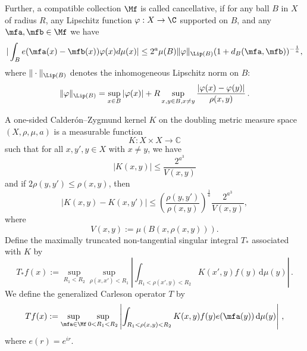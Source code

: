 Further, a compatible collection $\Mf$ is called cancellative, if
for any ball $B$ in $X$ of radius $R$, any Lipschitz function $\varphi: X\to \C$
supported on $B$, and any $\mfa,\mfb\in \Mf$ we have
\begin{equation}
    \label{eq-vdc-cond}
    |\int_B e(\mfa(x)-{\mfb(x)}) \varphi(x) d\mu(x)|\le 2^a \mu(B)\|\varphi\|_{\Lip(B)}
(1+d_B(\mfa,\mfb))^{-\frac{1}{a}},
\end{equation}
where $\|\cdot\|_{\Lip(B)}$ denotes the inhomogeneous Lipschitz norm on $B$:
$$
    \|\varphi\|_{\Lip(B)} = \sup_{x \in B} |\varphi(x)| + R \sup_{x,y \in B, x \neq y} \frac{|\varphi(x) - \varphi(y)|}{\rho(x,y)}\,.
$$

A one-sided Calder\'on--Zygmund kernel $K$ on the doubling metric measure space $(X, \rho, \mu, a)$ is a measurable function
 \begin{equation}\label{eqkernel0}
K:X\times X\to \mathbb{C}
 \end{equation}
such that for all $x,y',y\in X$ with $x\neq y$, we have
\begin{equation}\label{eqkernel-size}
    |K(x,y)| \leq \frac{2^{a^3}}{V(x,y)}
  \end{equation}
 and if $2\rho(y,y') \leq \rho(x,y)$, then
  \begin{equation}
  \label{eqkernel-y-smooth}
       |K(x,y) - K(x,y')| \leq \left(\frac{\rho(y,y')}{\rho(x,y)}\right)^{\frac{1}{a}}\frac{2^{a^3}}{V(x,y)},
\end{equation}
where \[V(x,y):=\mu(B(x,\rho(x,y))).\]
Define the maximally truncated non-tangential singular integral $T_{*}$ associated with $K$ by
\begin{equation}
    \label{def-tang-unm-op}
    T_{*}f(x):=\sup_{R_1 < R_2} \sup_{\rho(x,x')<R_1} \left|\int_{R_1< \rho(x',y) < R_2} K(x',y) f(y) \, \mathrm{d}\mu(y) \right|\,.
\end{equation}
We define the generalized Carleson operator $T$ by
 \begin{equation}
        \label{def-main-op}
        Tf(x):=\sup_{\mfa\in\Mf} \sup_{0 < R_1 < R_2}\left| \int_{R_1 < \rho(x,y) < R_2} K(x,y) f(y) e(\mfa(y)) \, \mathrm{d}\mu(y) \right|\, ,
\end{equation}
where $e(r)=e^{ir}$.

